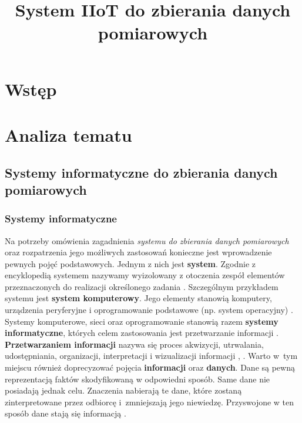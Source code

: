 \documentclass[a4paper, 12pt, twoside]{article}
\title{System IIoT do zbierania danych pomiarowych}
\date{}
\begin{document}
\clearpage\maketitle %
\thispagestyle{empty}

\listoftodos

\newpage

\section{Wstęp}

\section{Analiza tematu}

\subsection{Systemy informatyczne do zbierania danych pomiarowych} \label{system-do-zbierania-danych}

\subsubsection*{Systemy informatyczne}

Na potrzeby omówienia zagadnienia \emph{systemu do zbierania danych pomiarowych} oraz
rozpatrzenia jego możliwych zastosowań konieczne jest wprowadzenie pewnych 
pojęć podstawowych.
Jednym z nich jest \textbf{system}. Zgodnie z encyklopedią systemem
nazywamy wyizolowany z otoczenia zespół elementów przeznaczonych
do realizacji określonego zadania \cite{system}. Szczególnym przykładem systemu jest
\textbf{system komputerowy}. Jego elementy stanowią komputery, 
urządzenia peryferyjne
i oprogramowanie podstawowe (np. system operacyjny) \cite{system-komputerowy}.
Systemy komputerowe, sieci oraz oprogramowanie stanowią razem 
\textbf{systemy informatyczne}, których celem zastosowania jest 
przetwarzanie informacji \cite{system-informatyczny}. 
\textbf{Przetwarzaniem informacji} nazywa się proces akwizycji, utrwalania, udostępniania,
organizacji, interpretacji i wizualizacji informacji \cite{information-science}, 
\cite{information-processing}. Warto w~tym miejscu również doprecyzować pojęcia
\textbf{informacji} oraz \textbf{danych}. Dane są pewną reprezentacją
faktów skodyfikowaną w odpowiedni sposób. Same dane nie posiadają jednak celu.
Znaczenia nabierają te dane, które zostaną zinterpretowane przez odbiorcę 
i~zmniejszają jego niewiedzę.
Przyswojone w ten sposób dane stają się informacją \cite{dane-informacja-wiedza}.
\end{document}
